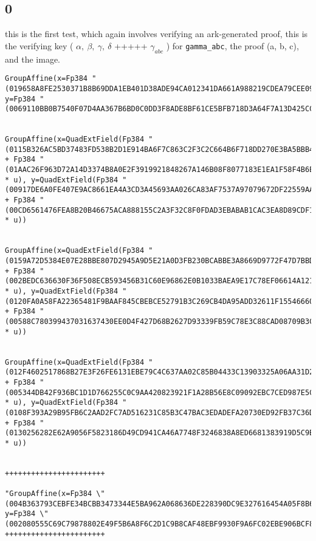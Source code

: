 \documentclass{article}
\newcommand{\inl}[1]{\lstinline{#1}}
\begin{document}
\subsection{0}

this is the first test, which again involves verifying an ark-generated proof, this is the verifying key ( \( \alpha, \ \beta, \ \gamma, \ \delta \) +++++ \( \gamma_{abc} \) ) for \inl{gamma_abc}, the proof (a, b, c), and the image.

\begin{lstlisting}
GroupAffine(x=Fp384 "(019658A8FE2530371B8B69DDA1EB401D38ADE94CA012341DA661A988219CDEA79CEE092B535FF84E71C2A9A18957B881)", y=Fp384 "(0069110BB0B7540F07D4AA367B6BD0C0DD3F8ADE8BF61CE5BFB718D3A64F7A13D425CC898EA11DCF59A065EEEDF0BB80)")


GroupAffine(x=QuadExtField(Fp384 "(0115B326AC5BD37483FD538B2D1E914BA6F7C863C2F3C2C664B6F718DD270E3BA5BBB456B5DB9EE53A190F79D4C6EC07)" + Fp384 "(01AAC26F963D72A14D3374B8A0E2F3919921848267A146B08F8077183E1EA1F58F4B6E716832254C54CD4B784BB63046)" * u), y=QuadExtField(Fp384 "(00917DE6A0FE407E9AC8661EA4A3CD3A45693AA026CA83AF7537A97079672DF22559AABA58FF1AA657F8F628600C520D)" + Fp384 "(00CD6561476FEA8B20B46675ACA888155C2A3F32C8F0FDAD3EBABAB1CAC3EA8D89CDF16A4D559A727E5BDBAFFD27D357)" * u))


GroupAffine(x=QuadExtField(Fp384 "(0159A72D5384E07E28BBE807D2945A9D5E21A0D3FB230BCABBE3A8669D9772F47D7BBDE56225D0C06D93416604C42CA0)" + Fp384 "(002BEDC636630F36F508ECB593456B31C60E96862E0B1033BAEA9E17C78EF06614A1211BA2A1FA49918B4F30260BB2B9)" * u), y=QuadExtField(Fp384 "(0120FA0A58FA22365481F9BAAF845CBEBCE52791B3C269CB4DA95ADD32611F1554666058A28452CC1ED42DFB7CB0FFC2)" + Fp384 "(00588C780399437031637430EE0D4F427D68B2627D93339FB59C78E3C88CAD08709B3CBF99303E8B7E25286DA29F9C6C)" * u))


GroupAffine(x=QuadExtField(Fp384 "(012F4602517868B27E3F26FE6131EBE79C4C637AA02C85B04433C13903325A06AA31D2B311D5C95A75C4A92143F46DB7)" + Fp384 "(005344DB42F936BC1D1D766255C0C9AA420823921F1A28B56E8C09092EBC7CED987E5C6E0C5C4B61522556656467EF25)" * u), y=QuadExtField(Fp384 "(0108F393A29B95FB6C2AAD2FC7AD516231C85B3C47BAC3EDADEFA20730ED92FB37C36D054A217C0EB39015B5F0490A5B)" + Fp384 "(0130256282E62A9056F5823186D49CD941CA46A7748F3246838A8ED6681383919D5C9BFD4EE89B8D48C960A93227A723)" * u))


+++++++++++++++++++++++

"GroupAffine(x=Fp384 \"(004B363793CEBFE34BCBB3473344E5BA962A068636DE228390DC9E327616454A05F8B6F3EF601E9212CCEF2977B65BAA)\", y=Fp384 \"(002080555C69C79878802E49F5B6A8F6C2D1C9B8CAF48EBF9930F9A6FC02EBE906BCF8DC2F66BBF7374EF8E0BDB6D93A)\")"
+++++++++++++++++++++++


\end{lstlisting}
\end{document}
